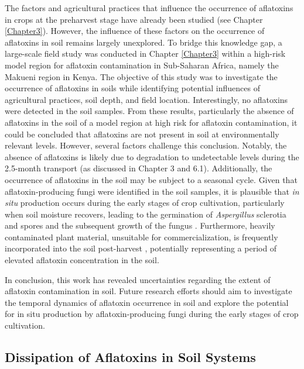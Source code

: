 The factors and agricultural practices that influence the occurrence of aflatoxins in crops at the preharvest stage have already been studied (see Chapter \ref{Chapter3}). However, the influence of these factors on the occurrence of aflatoxins in soil remains largely unexplored. To bridge this knowledge gap, a large-scale field study was conducted in Chapter  \ref{Chapter3} within a high-risk model region for aflatoxin contamination in Sub-Saharan Africa, namely the Makueni region in Kenya. The objective of this study was to investigate the occurrence of aflatoxins in soils while identifying potential influences of agricultural practices, soil depth, and field location. Interestingly, no aflatoxins were detected in the soil samples. From these results, particularly the absence of aflatoxins in the soil of a model region at high risk for aflatoxin contamination, it could be concluded that aflatoxins are not present in soil at environmentally relevant levels. However, several factors challenge this conclusion. Notably, the absence of aflatoxins is likely due to degradation to undetectable levels during the 2.5-month transport (as discussed in Chapter 3 and 6.1). Additionally, the occurrence of aflatoxins in the soil may be subject to a seasonal cycle. Given that aflatoxin-producing fungi were identified in the soil samples, it is plausible that \textit{in situ} production occurs during the early stages of crop cultivation, particularly when soil moisture recovers, leading to the germination of \textit{Aspergillus} sclerotia and spores and the subsequent growth of the fungus \citep{accinelli2008aspergillus, elmholt2008mycotoxins}. Furthermore, heavily contaminated plant material, unsuitable for commercialization, is frequently incorporated into the soil post-harvest \citep{horn2003ecology, horn1995effect}, potentially representing a period of elevated aflatoxin concentration in the soil.


In conclusion, this work has revealed uncertainties regarding the extent of aflatoxin contamination in soil. Future research efforts should aim to investigate the temporal dynamics of aflatoxin occurrence in soil and explore the potential for in situ production by aflatoxin-producing fungi during the early stages of crop cultivation.

\subsection{Dissipation of Aflatoxins in Soil Systems}


